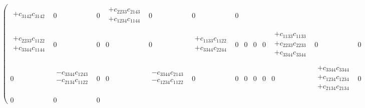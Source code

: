 \begin{eqnarray}
\begin{pmatrix}
\begin{array}{l}
+c_{3142}c_{3142} \\
\end{array} &
0 &
0 &
\begin{array}{l}
+c_{2233}c_{2143} \\
+c_{1234}c_{1144} \\
\end{array} &
0 &
0 &
0 \\
\begin{array}{l}
+c_{2233}c_{1122} \\
+c_{3344}c_{1144} \\
\end{array} &
0 &
0 &
0 &
0 &
\begin{array}{l}
+c_{1133}c_{1122} \\
+c_{3344}c_{2244} \\
\end{array} &
0 &
0 &
0 &
0 &
\begin{array}{l}
+c_{1133}c_{1133} \\
+c_{2233}c_{2233} \\
+c_{3344}c_{3344} \\
\end{array} &
0 &
0 &
0 &
0 &
\begin{array}{l}
+c_{1133}c_{1144} \\
+c_{2233}c_{2244} \\
\end{array} \\
0 &
\begin{array}{l}
-c_{3344}c_{1243} \\
-c_{2134}c_{1122} \\
\end{array} &
0 &
0 &
\begin{array}{l}
-c_{3344}c_{2143} \\
-c_{1234}c_{1122} \\
\end{array} &
0 &
0 &
0 &
0 &
0 &
0 &
\begin{array}{l}
+c_{3344}c_{3344} \\
+c_{1234}c_{1234} \\
+c_{2134}c_{2134} \\
\end{array} &
0 &
0 &
\begin{array}{l}
+c_{1234}c_{1243} \\
+c_{2134}c_{2143} \\
\end{array} &
0 \\
0 &
0 &
0 &
\begin{array}{l}

\end{array}
\end{pmatrix}
\end{eqnarray}
